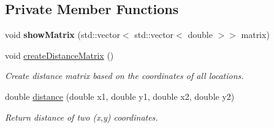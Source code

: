\subsection*{Private Member Functions}
\begin{DoxyCompactItemize}
\item 
\mbox{\label{class_init_ae6dd32b7bce12fb337831ec10f9c83df}} 
void {\bfseries show\+Matrix} (std\+::vector$<$ std\+::vector$<$ double $>$$>$ matrix)
\item 
\mbox{\label{class_init_ae4c5ffd68c39718f4918dda08166eedf}} 
void \hyperlink{class_init_ae4c5ffd68c39718f4918dda08166eedf}{create\+Distance\+Matrix} ()
\begin{DoxyCompactList}\small\item\em Create distance matrix based on the coordinates of all locations. \end{DoxyCompactList}\item 
double \hyperlink{class_init_a99ac0859d92852b421f4fc13973d9a70}{distance} (double x1, double y1, double x2, double y2)
\begin{DoxyCompactList}\small\item\em Return distance of two (x,y) coordinates. \end{DoxyCompactList}\end{DoxyCompactItemize}

